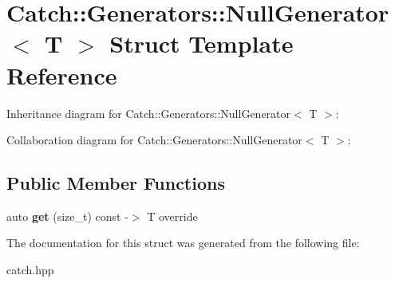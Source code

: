 \hypertarget{structCatch_1_1Generators_1_1NullGenerator}{}\section{Catch\+:\+:Generators\+:\+:Null\+Generator$<$ T $>$ Struct Template Reference}
\label{structCatch_1_1Generators_1_1NullGenerator}


Inheritance diagram for Catch\+:\+:Generators\+:\+:Null\+Generator$<$ T $>$\+:


Collaboration diagram for Catch\+:\+:Generators\+:\+:Null\+Generator$<$ T $>$\+:
\subsection*{Public Member Functions}
\begin{DoxyCompactItemize}
\item 
\mbox{\label{structCatch_1_1Generators_1_1NullGenerator_a17a2cc82d644e97afded4017c7a062ef}} 
auto {\bfseries get} (size\+\_\+t) const -\/$>$ T override
\end{DoxyCompactItemize}


The documentation for this struct was generated from the following file\+:\begin{DoxyCompactItemize}
\item 
catch.\+hpp\end{DoxyCompactItemize}
